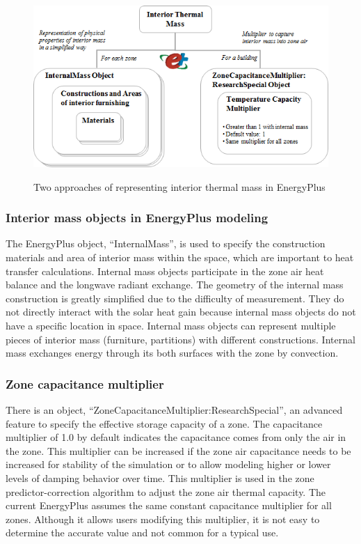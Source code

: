 \begin{figure}[h]
\begin{center}
\includegraphics[width=428pt]{media/img_HybridModel-2.png}
\caption{Two approaches of representing interior thermal mass in EnergyPlus}\protect \label{fig:two-approaches-of-representing-interior-thermal-mass-in-EnergyPlus}
\end{center}
\end{figure}
{\small  }


\subsubsection{Interior mass objects in EnergyPlus modeling}\label{interior-mass-objects-in-EnergyPlus-modeling}

The EnergyPlus object, “InternalMass”, is used to specify the construction materials and area of interior mass within the space, which are important to heat transfer calculations. Internal mass objects participate in the zone air heat balance and the longwave radiant exchange. The geometry of the internal mass construction is greatly simplified due to the difficulty of measurement. They do not directly interact with the solar heat gain because internal mass objects do not have a specific location in space. Internal mass objects can represent multiple pieces of interior mass (furniture, partitions) with different constructions. Internal mass exchanges energy through its both surfaces with the zone by convection. 

\subsubsection{Zone capacitance multiplier}\label{zone-capacitance-multiplier}

There is an object, “ZoneCapacitanceMultiplier:ResearchSpecial”, an advanced feature to specify the effective storage capacity of a zone. The capacitance multiplier of 1.0 by default indicates the capacitance comes from only the air in the zone. This multiplier can be increased if the zone air capacitance needs to be increased for stability of the simulation or to allow modeling higher or lower levels of damping behavior over time. This multiplier is used in the zone predictor-correction algorithm to adjust the zone air thermal capacity. The current EnergyPlus assumes the same constant capacitance multiplier for all zones. Although it allows users modifying this multiplier, it is not easy to determine the accurate value and not common for a typical use.

